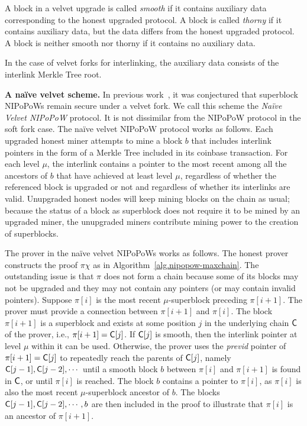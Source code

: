 \begin{definition}
A block in a velvet upgrade is called \emph{smooth} if it contains
auxiliary data corresponding to the honest upgraded protocol. A block
is called \emph{thorny} if it contains auxiliary data, but the data differs from
the honest upgraded protocol. A block is neither smooth nor thorny if it
contains no auxiliary data.
\end{definition}

In the case of velvet forks for interlinking, the auxiliary data consists
of the interlink Merkle Tree root.

\noindent
\textbf{A na\"ive velvet scheme.}
In previous work~\cite{nipopows}, it was conjectured that superblock NIPoPoWs
remain secure under a velvet fork. We call this scheme the \emph{Na\"ive Velvet
NIPoPoW} protocol. It is not dissimilar from the NIPoPoW protocol in the
soft fork case. The na\"ive velvet NIPoPoW protocol works as follows.
Each upgraded honest miner attempts to mine a block $b$
that includes interlink pointers in the form of a Merkle Tree included in its
coinbase transaction. For each level $\mu$, the interlink contains a pointer to
the most recent among all the ancestors of $b$ that have achieved at least
level $\mu$, regardless of whether the referenced block is upgraded or not and
regardless of whether its interlinks are valid. Unupgraded honest nodes will
keep mining blocks on the chain as usual; because the status of a block as
superblock does not require it to be mined by an upgraded miner, the unupgraded
miners contribute mining power to the creation of superblocks.

The prover in the na\"ive velvet NIPoPoWs works as follows. The honest
prover constructs the proof $\pi \chi$ as in Algorithm~\ref{alg.nipopow-maxchain}.
The outstanding issue is that
$\pi$ does not form a chain because some of
its blocks may not be upgraded and they may not contain any pointers (or may
contain invalid pointers).
Suppose $\pi[i]$ is the most recent $\mu$-superblock preceding $\pi[i + 1]$.
The prover must provide a connection between $\pi[i + 1]$ and $\pi[i]$.
The block $\pi[i + 1]$ is a superblock and exists at some position $j$ in the
underlying chain $\mathsf{C}$ of the prover, i.e., $\pi[i + 1] = \mathsf{C}[j]$. If
$\mathsf{C}[j]$ is smooth, then the interlink pointer at level $\mu$ within
it can be used. Otherwise, the prover uses the \emph{previd} pointer of
$\pi[i + 1] = \mathsf{C}[j]$ to repeatedly reach the parents of $\mathsf{C}[j]$, namely
$\mathsf{C}[j - 1], \mathsf{C}[j - 2], \cdots$ until a smooth block $b$ between $\pi[i]$
and $\pi[i + 1]$ is found in $\mathsf{C}$, or until $\pi[i]$ is reached.
The block $b$ contains a pointer to
$\pi[i]$, as $\pi[i]$ is also the most recent $\mu$-superblock ancestor of $b$.
The blocks $\mathsf{C}[j - 1], \mathsf{C}[j - 2], \cdots, b$ are then included in the
proof to illustrate that $\pi[i]$ is an ancestor of $\pi[i + 1]$.

